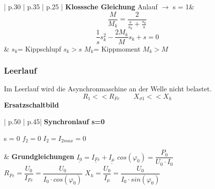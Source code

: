 \begin{longtable}{| p{.30\textwidth} | p{.35\textwidth} | p{.25\textwidth} |}
        \textbf{Klosssche Gleichung}\newline
        Anlauf $\rightarrow$ s = 1&
        \[ \frac{M}{M_k}=\frac{2}{\frac{s}{s_k}+\frac{s_k}{s}} \]
        \[ \frac{1}{s} s_k^2 - \frac{2 M_k}{M}s_k+s=0 \]&
        $ s_k $= Kippschlupf\newline
        $ s_k > s $\newline
        $ M_k $= Kippmoment\newline
        $ M_k > M$
        \\ \hline        
              
    \end{longtable}
\clearpage
    \subsubsection{Leerlauf}
    \begin{multicols}{2}
        \begin{minipage}{\linewidth}
            Im Leerlauf wird die Asynchronmaschine an der \newline Welle nicht belastet.
            \[ R_1 << R_{Fe} \qquad X_{\sigma 1} << X_h\]
            \textbf{Ersatzschaltbild}\newline
        \end{minipage}
        
        \begin{minipage}{\linewidth}
        \end{minipage}
    \end{multicols} 
    \begin{longtable}{| p{.50\textwidth} | p{.45\textwidth}|}
        \hline
         \textbf{Synchronlauf \quad s=0} \newline
         \begin{minipage}{0.5\linewidth}    
         s = 0 \newline
         $ f_2 = 0 $\newline
         $ I_2 = I_{2max} = 0$\newline\newline
        \end{minipage}
         &
         \textbf{Grundgleichungen}\newline
         $ \underline{I_0}=\underline{I_{Fe}} + \underline{I_\mu} $\newline
          $ cos(\varphi_0)= \dfrac{P_0}{U_0 \cdot I_0} $\newline
          $ R_{Fe}=\dfrac{U_0}{I_{Fe}}=\dfrac{U_0}{I_0 \cdot cos(\varphi_0)} $\newline
           $ X_h = \dfrac{U_0}{I_\mu}=\dfrac{U_0}{I_0 \cdot sin(\varphi_0)} $
         \\ \hline
    \end{longtable}
    
